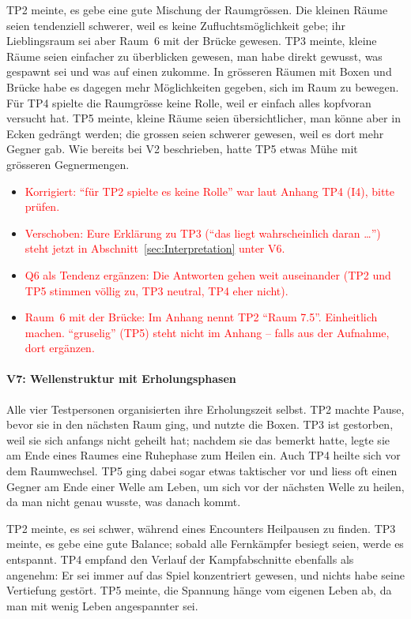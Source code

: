 \documentclass[../Main.tex]{subfiles}
\begin{document}
TP2 meinte, es gebe eine gute Mischung der Raumgrössen. Die kleinen Räume seien tendenziell schwerer, weil es keine Zufluchtsmöglichkeit gebe; ihr Lieblingsraum sei aber Raum~6 mit der Brücke gewesen. TP3 meinte, kleine Räume seien einfacher zu überblicken gewesen, man habe direkt gewusst, was gespawnt sei und was auf einen zukomme. In grösseren Räumen mit Boxen und Brücke habe es dagegen mehr Möglichkeiten gegeben, sich im Raum zu bewegen. Für TP4 spielte die Raumgrösse keine Rolle, weil er einfach alles kopfvoran versucht hat. TP5 meinte, kleine Räume seien übersichtlicher, man könne aber in Ecken gedrängt werden; die grossen seien schwerer gewesen, weil es dort mehr Gegner gab. Wie bereits bei V2 beschrieben, hatte TP5 etwas Mühe mit grösseren Gegnermengen.

\begin{itemize}[leftmargin=1.5cm]
    \item \textcolor{red}{Korrigiert: \enquote{für TP2 spielte es keine Rolle} war laut Anhang TP4 (I4), bitte prüfen.}
    \item \textcolor{red}{Verschoben: Eure Erklärung zu TP3 (\enquote{das liegt wahrscheinlich daran \ldots}) steht jetzt in Abschnitt~\ref{sec:Interpretation} unter V6.}
    \item \textcolor{red}{Q6 als Tendenz ergänzen: Die Antworten gehen weit auseinander (TP2 und TP5 stimmen völlig zu, TP3 neutral, TP4 eher nicht).}
    \item \textcolor{red}{Raum~6 mit der Brücke: Im Anhang nennt TP2 \enquote{Raum 7.5}. Einheitlich machen. \enquote{gruselig} (TP5) steht nicht im Anhang -- falls aus der Aufnahme, dort ergänzen.}
\end{itemize}

\paragraph{V7: Wellenstruktur mit Erholungsphasen}
Alle vier Testpersonen organisierten ihre Erholungszeit selbst. TP2 machte Pause, bevor sie in den nächsten Raum ging, und nutzte die Boxen. TP3 ist gestorben, weil sie sich anfangs nicht geheilt hat; nachdem sie das bemerkt hatte, legte sie am Ende eines Raumes eine Ruhephase zum Heilen ein. Auch TP4 heilte sich vor dem Raumwechsel. TP5 ging dabei sogar etwas taktischer vor und liess oft einen Gegner am Ende einer Welle am Leben, um sich vor der nächsten Welle zu heilen, da man nicht genau wusste, was danach kommt.

TP2 meinte, es sei schwer, während eines Encounters Heilpausen zu finden. TP3 meinte, es gebe eine gute Balance; sobald alle Fernkämpfer besiegt seien, werde es entspannt. TP4 empfand den Verlauf der Kampfabschnitte ebenfalls als angenehm: Er sei immer auf das Spiel konzentriert gewesen, und nichts habe seine Vertiefung gestört. TP5 meinte, die Spannung hänge vom eigenen Leben ab, da man mit wenig Leben angespannter sei.
\end{document}
